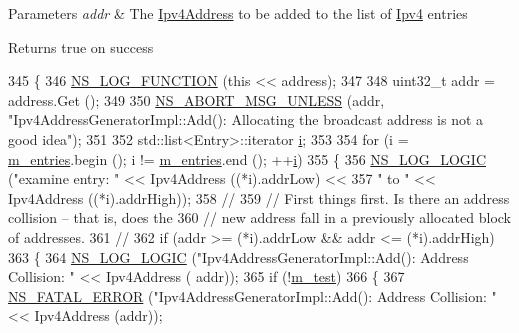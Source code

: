 \begin{DoxyParams}{Parameters}
{\em addr} & The \hyperlink{classns3_1_1Ipv4Address}{Ipv4\+Address} to be added to the list of \hyperlink{classns3_1_1Ipv4}{Ipv4} entries \\
\hline
\end{DoxyParams}
\begin{DoxyReturn}{Returns}
true on success 
\end{DoxyReturn}

\begin{DoxyCode}
345 \{
346   \hyperlink{log-macros-disabled_8h_a90b90d5bad1f39cb1b64923ea94c0761}{NS\_LOG\_FUNCTION} (\textcolor{keyword}{this} << address);
347 
348   uint32\_t addr = address.Get ();
349 
350   \hyperlink{group__fatal_ga0bd3f62c55e7347ff814572f3aaa3864}{NS\_ABORT\_MSG\_UNLESS} (addr, \textcolor{stringliteral}{"Ipv4AddressGeneratorImpl::Add(): Allocating the broadcast
       address is not a good idea"}); 
351  
352   std::list<Entry>::iterator \hyperlink{bernuolliDistribution_8m_a6f6ccfcf58b31cb6412107d9d5281426}{i};
353 
354   \textcolor{keywordflow}{for} (i = \hyperlink{classns3_1_1Ipv4AddressGeneratorImpl_aa038cfd5736c3d67f5433c3a2aa20cbf}{m\_entries}.begin (); i != \hyperlink{classns3_1_1Ipv4AddressGeneratorImpl_aa038cfd5736c3d67f5433c3a2aa20cbf}{m\_entries}.end (); ++\hyperlink{bernuolliDistribution_8m_a6f6ccfcf58b31cb6412107d9d5281426}{i})
355     \{
356       \hyperlink{group__logging_ga88acd260151caf2db9c0fc84997f45ce}{NS\_LOG\_LOGIC} (\textcolor{stringliteral}{"examine entry: "} << Ipv4Address ((*i).addrLow) << 
357                     \textcolor{stringliteral}{" to "} << Ipv4Address ((*i).addrHigh));
358 \textcolor{comment}{//}
359 \textcolor{comment}{// First things first.  Is there an address collision -- that is, does the}
360 \textcolor{comment}{// new address fall in a previously allocated block of addresses.}
361 \textcolor{comment}{//}
362       \textcolor{keywordflow}{if} (addr >= (*i).addrLow && addr <= (*i).addrHigh)
363         \{
364           \hyperlink{group__logging_ga88acd260151caf2db9c0fc84997f45ce}{NS\_LOG\_LOGIC} (\textcolor{stringliteral}{"Ipv4AddressGeneratorImpl::Add(): Address Collision: "} << Ipv4Address (
      addr)); 
365           \textcolor{keywordflow}{if} (!\hyperlink{classns3_1_1Ipv4AddressGeneratorImpl_ae80732b27ea2032ba783dce3f92d264b}{m\_test}) 
366             \{
367               \hyperlink{group__fatal_ga5131d5e3f75d7d4cbfd706ac456fdc85}{NS\_FATAL\_ERROR} (\textcolor{stringliteral}{"Ipv4AddressGeneratorImpl::Add(): Address Collision: "} << 
      Ipv4Address (addr));

\end{DoxyCode}
